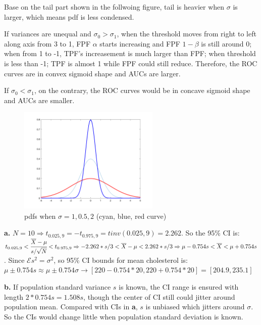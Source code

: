 \documentclass[12pt,a4paper]{article}
\begin{document}
Base on the tail part shown in the follwoing figure, tail is heavier when $\sigma$ is larger, which means pdf is less condensed.

If variances are unequal and $\sigma_0>\sigma_1$, when the threshold moves from right to left along axis from 3 to 1, FPF $\alpha$ starts increasing and FPF $1-\beta$ is still around 0; when from 1 to -1, TPF's increasement is much larger than FPF; when threshold is less than -1; TPF is almost 1 while FPF could still reduce. Therefore, the ROC curves are in convex sigmoid shape and AUCs are larger. 

If $\sigma_0<\sigma_1$, on the contrary, the ROC curves would be in concave sigmoid shape and AUCs are smaller. 

\begin{figure}[!ht]
\centering
\includegraphics*[width=0.6\textwidth]{hw_8_4_sigma.png}
\caption{pdfs when $\sigma=1,0.5,2$ (cyan, blue, red curve)}
\end{figure}

\newpage
{}
\textbf{a.} $N=10\Rightarrow t_{0.025,9}=-t_{0.975,9}=tinv(0.025,9)=2.262$. So the 95\% CI is: $t_{0.025,9}<\cfrac{\overline X-\mu}{s/\sqrt{N}}<t_{0.975,9}\Rightarrow
-2.262*s/3<\overline X-\mu<2.262*s/3\\\Rightarrow\mu-0.754s<\overline X <\mu+0.754s$. Since $\mathcal{E}s^2=\sigma^2$, so 95\% CI bounds for mean cholesterol is:\\ $\mu\pm 0.754s\approx\mu\pm 0.754\sigma\rightarrow[220-0.754*20,220+0.754*20]=[204.9,235.1]$

\noindent\textbf{b.} If population standard variance $s$ is known, the CI range is ensured with length $2*0.754s=1.508s$, though the center of CI still could jitter around population mean. Compared with CIs in \textbf{a}, $s$ is unbiased which jitters around $\sigma$. So the CIs would change little when population standard deviation is known.   
\end{document}
